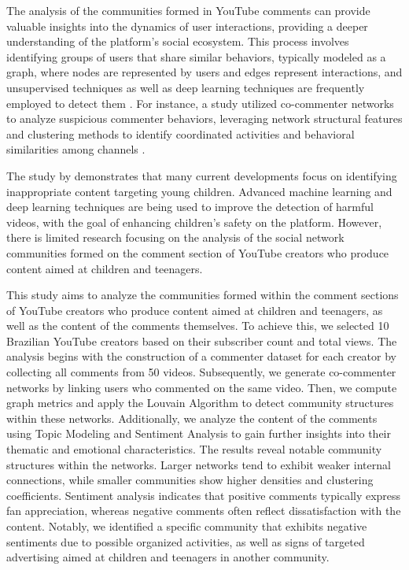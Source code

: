 \documentclass[12pt]{article}
\begin{document}
The analysis of the communities formed in YouTube comments can provide valuable 
insights into the dynamics of user interactions, providing a deeper understanding of 
the platform's social ecosystem. This process involves identifying groups of users that share similar
behaviors, typically modeled as a graph, where nodes are represented by users and edges represent 
interactions, and unsupervised techniques as well as deep learning techniques are frequently employed 
to detect them \cite{nooribakhsh2024community}. For instance, a study utilized co-commenter networks 
to analyze suspicious commenter behaviors, leveraging network structural features and clustering 
methods to identify coordinated activities and behavioral similarities among channels \cite{shajari2023} .

The study by \cite{app13064044} demonstrates that many current developments focus on identifying
inappropriate content targeting young children. Advanced machine learning and deep learning 
techniques are being used to improve the detection of harmful videos, with the goal of enhancing 
children's safety on the platform. However, there is limited research focusing on the analysis of 
the social network communities formed on the comment section of YouTube creators who 
produce content aimed at children and teenagers.

This study aims to analyze the communities formed within the comment sections of YouTube creators who 
produce content aimed at children and teenagers, as well as the content of the comments themselves. 
To achieve this, we selected 10 Brazilian YouTube creators based on their 
subscriber count and total views. The analysis begins with the construction of a commenter dataset for 
each creator by collecting all comments from 50 videos. Subsequently, we generate co-commenter networks 
by linking users who commented on the same video. Then, we compute graph metrics and apply the 
Louvain Algorithm to detect community structures within these networks. Additionally, we analyze the 
content of the comments using Topic Modeling and Sentiment Analysis to gain further 
insights into their thematic and emotional characteristics. 
The results reveal notable community structures within the networks. Larger networks tend to exhibit 
weaker internal connections, while smaller communities show higher densities and clustering coefficients. 
Sentiment analysis indicates that positive comments typically express fan appreciation, whereas negative 
comments often reflect dissatisfaction with the content. 
Notably, we identified a specific community that exhibits negative sentiments due 
to possible organized activities, as well as signs of targeted advertising aimed at children and teenagers 
in another community. 
\end{document}
